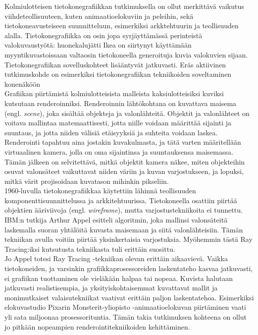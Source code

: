 \documentclass[a4paper,12pt, titlepage]{article}
\theoremstyle{break}
\begin{document}
Kolmiulotteisen tietokonegrafiikkan tutkimuksella on ollut merkittävä vaikutus viihdeteollisuuteen, kuten animaatioelokuviin ja peleihin, sekä tietokoneavusteiseen suunnitteluun, esimerkiksi arkktehtuurin ja teollisuuden alalla.  Tietokonegrafiikka on osin jopa syrjäyttämässä perinteistä valokuvaustyötä: huonekalujätti Ikea on siirtynyt käyttämään myyntikuvastoissaan valtaosin tietokoneella generoituja kuvia valokuvien sijaan.\cite{ikea} Tietokonegrafiikan sovelluskohteet lisääntyvät jatkuvasti. Eräs aktiivinen tutkimuskohde on esimerkiksi tietokonegrafiikan tekniikoiden soveltaminen konenäköön \cite{hughes}\\

Grafiikan piirtämistä kolmiulotteisista malleista kaksiulotteisiksi kuviksi kutsutaan renderoinniksi. Renderoinnin lähtökohtana on kuvattava maisema (engl. \emph{scene}), joka sisältää objekteja ja valonlähteitä. Objektit ja valonlähteet on voitava mallintaa matemaattisesti, jotta niille voidaan määrittää sijainti ja suuntaus, ja jotta niiden välisiä etäisyyksiä ja suhteita voidaan laskea. Renderointi tapahtuu aina jostakin kuvakulmasta, ja tätä varten määritellään virtuaalinen kamera, jolla on oma sijaintinsa ja suuntauksensa maisemassa. Tämän jälkeen on selvitettävä, mitkä objektit kamera näkee, miten objekteihin osuvat valonsäteet vaikuttavat niiden väriin ja kuvan varjostukseen, ja lopuksi, mitkä värit projisoidaan kuvatason mihinkin pikseliin.\cite{janke}\\

1960-luvulla tietokonegrafiikkaa käytettiin lähinnä teollisuuden komponenttisuunnittelussa ja arkkitehtuurissa. Tietokoneella osattiin piirtää objektien ääriviivoja (engl. \emph{wireframe}), mutta varjostustekniikoita ei tunnettu. IBM:n tutkija Arthur Appel esitteli algoritmin, joka mallinsi valonsäteitä laskemalla suoran yhtälöitä kuvasta maisemaan ja siitä valonlähteisiin. Tämän tekniikan avulla voitiin piirtää yksinkertaisia varjostuksia.\cite{appel} Myöhemmin tästä Ray Tracing:iksi kutsutusta tekniikasta tuli erittäin suosittu.\\

Jo Appel totesi Ray Tracing -tekniikan olevan erittäin aikaavievä.\cite{appel} Vaikka tietokoneiden, ja varsinkin grafiikkaprosessoreiden laskentateho kasvaa jatkuvasti, ei grafiikan tuottaminen ole vieläkään halpaa tai nopeaa. Kuvista halutaan jatkuvasti realistisempia, ja yksityiskohtaisemmat kuvattavat mallit ja monimutkaiset valaisutekniikat vaativat erittäin paljon laskentatehoa. Esimerkiksi elokuvastudio Pixarin Monsterit-yliopisto -animaatioelokuvan piirtäminen vaati yli sata miljoonaa prosessorituntia.\cite{monsterit} Tämän takia tutkimuksen kohteena on ollut jo pitkään nopeampien renderointitekniikoiden kehittäminen.\\
\end{document}
